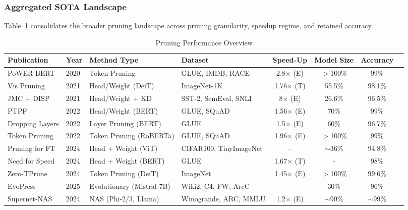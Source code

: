 \subsubsection{Aggregated SOTA Landscape}

Table~\ref{tab:comprehensive_pruning} consolidates the broader pruning landscape across pruning granularity, speedup regime, and retained accuracy.

\begin{table}[H]
	\begin{adjustwidth}{-1.2cm}{0cm}
		\centering
		\caption{Pruning Performance Overview}
		\label{tab:comprehensive_pruning}
		\begin{tabular}{@{}lllp{4.5cm}cccc@{}}
			\toprule
			\textbf{Publication} & \textbf{Year} & \textbf{Method Type} & \textbf{Dataset} & \textbf{Speed-Up} & \textbf{Model Size} & \textbf{Accuracy} \\ \midrule
			PoWER-BERT & 2020 & Token Pruning & GLUE, IMDB, RACE & 2.8$\times$ (E) & $>$100\% & 99\% \\
			Vis Pruning & 2021 & Head/Weight (DeiT) & ImageNet-1K & 1.76$\times$ (T) & 55.5\% & 98.1\% \\
			JMC + DISP & 2021 & Head/Weight + KD & SST-2, SemEval, SNLI & 8$\times$ (E) & 26.6\% & 96.5\% \\
			PTPF & 2022 & Head/Weight (BERT) & GLUE, SQuAD & 1.56$\times$ (E) & 70\% & 99\% \\
			Dropping Layers & 2022 & Layer Pruning (BERT) & GLUE & 1.5$\times$ (E) & 60\% & 96.7\% \\
			Token Pruning & 2022 & Token Pruning (RoBERTa) & GLUE, SQuAD & 1.96$\times$ (E) & $>$100\% & 99\% \\
			Pruning for FT & 2024 & Head + Weight (ViT) & CIFAR100, TinyImageNet & - & $\sim$36\% & 94.8\% \\
			Need for Speed & 2024 & Head + Weight (BERT) & GLUE & 1.67$\times$ (T) & - & 98\% \\
			Zero-TPrune & 2024 & Token Pruning (DeiT) & ImageNet & 1.45$\times$ (E) & $>$100\% & 99.6\% \\
			EvoPress & 2025 & Evolutionary (Mistral-7B) & Wiki2, C4, FW, ArcC & - & 30\% & 96\% \\
			Supernet-NAS & 2024 & NAS (Phi-2/3, Llama) & Winogrande, ARC, MMLU & 1.2$\times$ (E) & $\sim$90\% & $\sim$99\% \\
			\bottomrule
		\end{tabular}
	\end{adjustwidth}
\end{table}